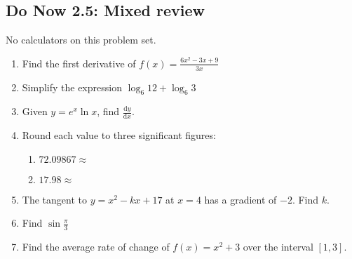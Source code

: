 \documentclass[12pt, oneside]{article}
\begin{document}
\subsection*{Do Now 2.5: Mixed review}
No calculators on this problem set.

\begin{enumerate}
  \item Find the first derivative of $\displaystyle f(x)=\frac{6x^2 - 3x + 9}{3x}$ \vspace{5cm}
  \item Simplify the expression $\log_6 12 + \log_6 3$ \vspace{3cm}
  \item Given $y=e^x \ln x$, find $\frac{\mathrm{d}y}{\mathrm{d}x}$. \vspace{6cm}
  \item Round each value to three significant figures:
  \begin{enumerate}
    \item $72.09867 \approx$ \vspace{2cm}
    \item $17.98 \approx$
  \end{enumerate}
  \newpage
  \item The tangent to $y=x^2-kx+17$ at $x=4$ has a gradient of $-2$. Find $k$. \vspace{8cm}
  \item Find $\sin \frac{\pi}{3}$ \vspace{3cm}
  \item Find the average rate of change of $f(x)=x^2+3$ over the interval $[1,3]$.

\end{enumerate}
\end{document}

